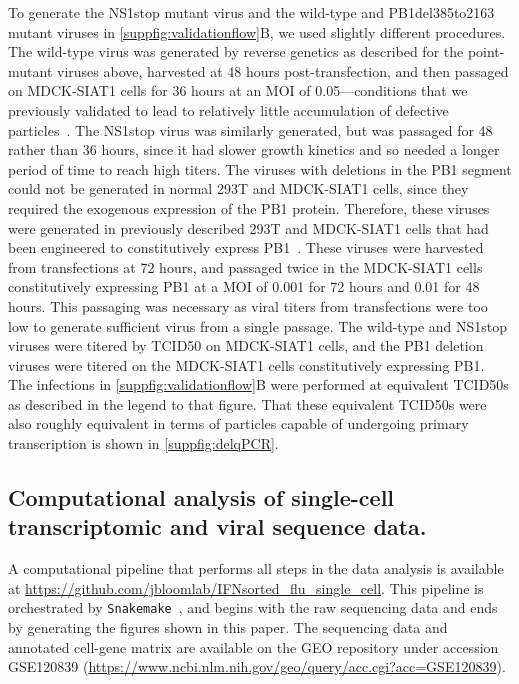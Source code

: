 \documentclass[lineno]{asm-article}
\newcommand{\SUPPFIG}[1]{\autoref{suppfig:#1}}
\begin{document}
To generate the NS1stop mutant virus and the wild-type and PB1del385to2163 mutant viruses in \SUPPFIG{validationflow}B, we used slightly different procedures.
The wild-type virus was generated by reverse genetics as described for the point-mutant viruses above, harvested at 48 hours post-transfection, and then passaged on MDCK-SIAT1 cells for 36 hours at an MOI of 0.05---conditions that we previously validated to lead to relatively little accumulation of defective particles~\cite{russell2018extreme}.
The NS1stop virus was similarly generated, but was passaged for 48 rather than 36 hours, since it had slower growth kinetics and so needed a longer period of time to reach high titers.
The viruses with deletions in the PB1 segment could not be generated in normal 293T and MDCK-SIAT1 cells, since they required the exogenous expression of the PB1 protein.
Therefore, these viruses were generated in previously described 293T and MDCK-SIAT1 cells that had been engineered to constitutively express PB1~\cite{bloom2010permissive}.
These viruses were harvested from transfections at 72 hours, and passaged twice in the MDCK-SIAT1 cells constitutively expressing PB1 at a MOI of 0.001 for 72 hours and 0.01 for 48 hours. 
This passaging was necessary as viral titers from transfections were too low to generate sufficient virus from a single passage.
The wild-type and NS1stop viruses were titered by TCID50 on MDCK-SIAT1 cells, and the PB1 deletion viruses were titered on the MDCK-SIAT1 cells constitutively expressing PB1.
The infections in \SUPPFIG{validationflow}B were performed at equivalent TCID50s as described in the legend to that figure.
That these equivalent TCID50s were also roughly equivalent in terms of particles capable of undergoing primary transcription is shown in \SUPPFIG{delqPCR}.

\subsection{Computational analysis of single-cell transcriptomic and viral sequence data.}
A computational pipeline that performs all steps in the data analysis is available at \url{https://github.com/jbloomlab/IFNsorted_flu_single_cell}. 
This pipeline is orchestrated by \texttt{Snakemake}~\cite{koster2012snakemake}, and begins with the raw sequencing data and ends by generating the figures shown in this paper.
The sequencing data and annotated cell-gene matrix are available on the GEO repository under accession GSE120839 (\url{https://www.ncbi.nlm.nih.gov/geo/query/acc.cgi?acc=GSE120839}).
\end{document}
